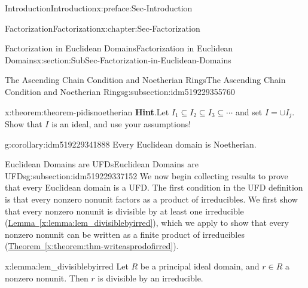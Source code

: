 \documentclass[oneside,10pt,]{book}
\newcommand{\blocktitlefont}{\relax}
\newcommand{\xreffont}{\relax}
\numberwithin{equation}{section}
\begin{document}
\begin{preface}{Introduction}{}{Introduction}{}{}{x:preface:Sec-Introduction}
\begin{chapterptx}{Factorization}{}{Factorization}{}{}{x:chapter:Sec-Factorization}
\begin{sectionptx}{Factorization in Euclidean Domains}{}{Factorization in Euclidean Domains}{}{}{x:section:SubSec-Factorization-in-Euclidean-Domains}
\begin{subsectionptx}{The Ascending Chain Condition and Noetherian Rings}{}{The Ascending Chain Condition and Noetherian Rings}{}{}{g:subsection:idm519229355760}
\begin{theorem}{}{}{x:theorem:theorem-pidisnoetherian}
\textbf{\blocktitlefont Hint}.\quad{}Let \(I_1\subseteq I_2\subseteq I_3 \subseteq \cdots\) and set \(I = \cup I_j\). Show that \(I\) is an ideal, and use your assumptions!%
\end{theorem}
\begin{corollary}{}{}{g:corollary:idm519229341888}%
Every Euclidean domain is Noetherian.%
\end{corollary}
\end{subsectionptx}
%
%
\typeout{************************************************}
\typeout{************************************************}
%
\begin{subsectionptx}{Euclidean Domains are UFDs}{}{Euclidean Domains are UFDs}{}{}{g:subsection:idm519229337152}
We now begin collecting results to prove that every Euclidean domain is a UFD. The first condition in the UFD definition is that every nonzero nonunit factors as a product of irreducibles. We first show that every nonzero nonunit is divisible by at least one irreducible (\hyperref[x:lemma:lem_divisiblebyirred]{Lemma~{\xreffont\ref{x:lemma:lem_divisiblebyirred}}}), which we apply to show that every nonzero nonunit can be written as a finite product of irreducibles (\hyperref[x:theorem:thm-writeasprodofirred]{Theorem~{\xreffont\ref{x:theorem:thm-writeasprodofirred}}}).%
\begin{lemma}{}{}{x:lemma:lem_divisiblebyirred}%
Let \(R\) be a principal ideal domain, and \(r\in R\) a nonzero nonunit. Then \(r\) is divisible by an irreducible.%



\end{lemma}
\end{subsectionptx}
\end{sectionptx}
\end{chapterptx}
\end{preface}
\end{document}
